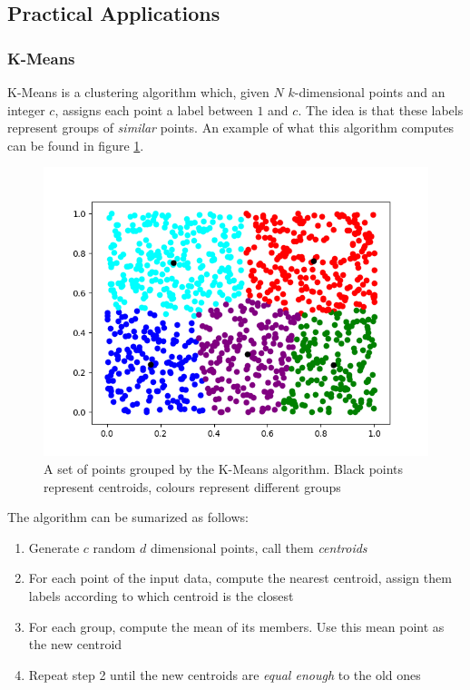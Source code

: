\subsection{Practical Applications}
\label{subsec:storage_apps}
\subsubsection{K-Means}
\label{subsubsec:kmeans_redis}
K-Means \cite{Lloyd82leastsquares} is a clustering algorithm which, given $N$ $k$-dimensional points and an integer $c$, assigns each point a label between $1$ and $c$. The idea is that these labels represent groups of \textit{similar} points. An example of what this algorithm computes can be found in figure \ref{fig:kmeans_example}.

\begin{figure}
\centering
\includegraphics[scale = 0.5]{figures/kmeans_example.png}
\caption{A set of points grouped by the K-Means algorithm. Black points represent centroids, colours represent different groups}
\label{fig:kmeans_example}
\end{figure}

The algorithm can be sumarized as follows:

\begin{enumerate}
\item Generate $c$ random $d$ dimensional points, call them \textit{centroids}
\item For each point of the input data, compute the nearest centroid, assign them labels according to which centroid is the closest
\item For each group, compute the mean of its members. Use this mean point as the new centroid
\item Repeat step 2 until the new centroids are \textit{equal enough} to the old ones
\end{enumerate}

